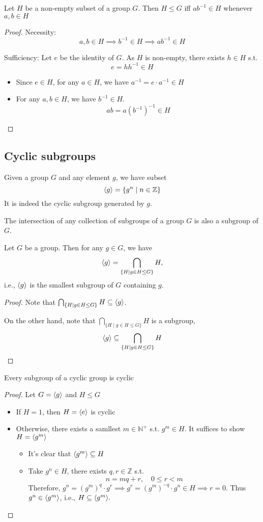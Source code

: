 \begin{proposition}
Let $H$ be a non-empty subset of a group $G$. Then $H\le G$ iff $ab^{-1}\in H$ whenever $a,b\in H$
\end{proposition}
\begin{proof}
Necessity: 
\[
a,b\in H\implies b^{-1}\in H\implies ab^{-1}\in H
\]

Sufficiency: Let $e$ be the identity of $G$. As $H$ is non-empty, there exists $h\in H$ s.t.
\[
e=hh^{-1}\in H
\]
\begin{itemize}
\item
Since $e\in H$, for any $a\in H$, we have $a^{-1}=e\cdot a^{-1}\in H$
\item
For any $a,b\in H$, we have $b^{-1}\in H$. 
\[
ab = a(b^{-1})^{-1}\in H
\]
\end{itemize}
\end{proof}
\subsection{Cyclic subgroups}
Given a group $G$ and any element $g$, we have subset
\[
\langle g\rangle=\{g^n\mid n\in\mathbb{Z}\}
\]
It is indeed the cyclic subgroup generated by $g$.
\begin{proposition}
The intersection of any collection of subgroups of a group $G$ is also a subgroup of $G$.
\end{proposition}

\begin{corollary}
Let $G$ be a group. Then for any $g\in G$, we have
\[
\langle g\rangle =\bigcap_{\{H\mid g\in H\le G\}}H,
\]
i.e., $\langle g\rangle$ is the smallest subgroup of $G$ containing $g$.
\end{corollary}
\begin{proof}
Note that $\bigcap_{\{H\mid g\in H\le G\}}H\subseteq\langle g\rangle$.

On the other hand, note that $\bigcap_{\{H\mid g\in H\le G\}}H$ is a subgroup,
\[
\langle g\rangle\subseteq\bigcap_{\{H\mid g\in H\le G\}}H
\]
\end{proof}
\begin{proposition}
Every subgroup of a cyclic group is cyclic
\end{proposition}
\begin{proof}
Let $G=\langle g\rangle$ and $H\le G$
\begin{itemize}
\item
If $H=1$, then $H=\langle e\rangle$ is cyclic
\item
Otherwise, there exists a samllest $m\in\mathbb{N}^+$ s.t. $g^m\in H$. It suffices to show $H=\langle g^m\rangle$
\begin{itemize}
\item
It's clear that $\langle g^m\rangle\subseteq H$
\item
Take $g^n\in H$, there exists $q,r\in\mathbb{Z}$ s.t.
\[
n=mq+r,\quad
0\le r<m
\]
Therefore, $g^n = (g^m)^q\cdot g^r\implies g^r = (g^m)^{-q}\cdot g^n\in H\implies r=0$. Thus $g^n\in\langle g^m\rangle$, i.e., $H\subseteq\langle g^m\rangle.$
\end{itemize}
\end{itemize}
\end{proof}

